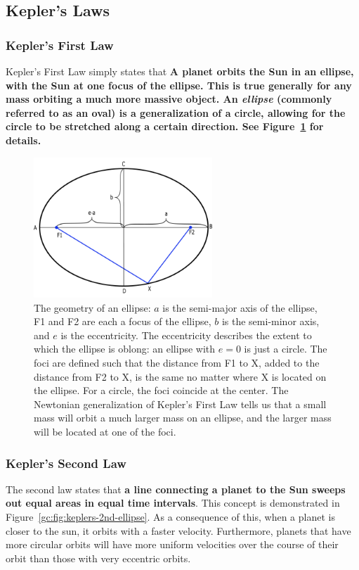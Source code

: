 \subsection{Kepler's Laws}
\subsubsection{Kepler's First Law}
Kepler's First Law simply states that \textbf{\textbf{A planet orbits the Sun in an ellipse, with the Sun at one focus of the ellipse.} This is true generally for any mass orbiting a much more massive object. An \textit{ellipse} (commonly referred to as an oval) is a generalization of a circle, allowing for the circle to be stretched along a certain direction. See Figure~\ref{gc:fig:ellipse} for details.}
\begin{figure}
	\centering
	\includegraphics[width=0.6\textwidth]{galactic-center/ellipse.png}
	\caption{The geometry of an ellipse: $a$ is the semi-major axis of the ellipse, F1 and F2 are each a
		focus of the ellipse, $b$ is the semi-minor axis, and $e$ is the eccentricity. The eccentricity describes
		the extent to which the ellipse is oblong: an ellipse with $e = 0$ is just a circle. The foci are defined such
		that the distance from F1 to X, added to the distance from F2 to X, is the same no matter where X
		is located on the ellipse. For a circle, the foci coincide at the center. The Newtonian generalization of
		Kepler's First Law tells us that a small mass will orbit a much larger mass on an ellipse, and the larger
		mass will be located at one of the foci.}\label{gc:fig:ellipse}
\end{figure}
\subsubsection{Kepler's Second Law}
The second law states that \textbf{a line connecting a planet to the Sun sweeps out equal areas in
equal time intervals}. This concept is demonstrated in Figure~\ref{gc:fig:keplers-2nd-ellipse}. As a consequence of this, when a
planet is closer to the sun, it orbits with a faster velocity. Furthermore, planets that have more circular
orbits will have more uniform velocities over the course of their orbit than those with very eccentric
orbits.

